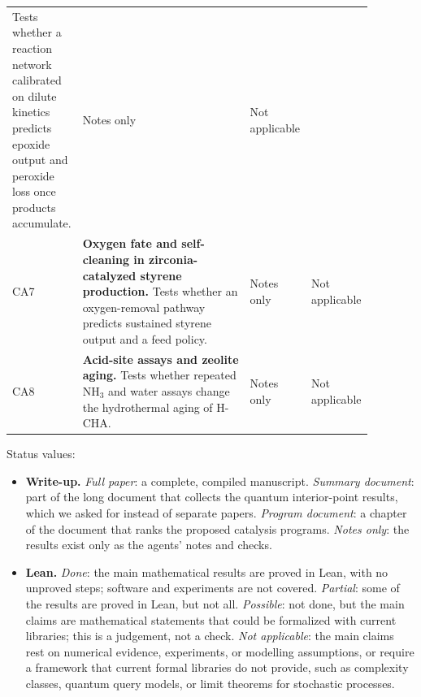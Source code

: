 \begin{small}
\begin{longtable}{@{}l>{\raggedright\arraybackslash}p{0.60\linewidth}%
  >{\raggedright\arraybackslash}p{0.15\linewidth}%
  >{\raggedright\arraybackslash}p{0.13\linewidth}@{}}
  Tests whether a reaction network calibrated on dilute kinetics predicts
  epoxide output and peroxide loss once products accumulate.
  & Notes only & Not applicable \\
CA7 & \textbf{Oxygen fate and self-cleaning in zirconia-catalyzed styrene
  production.}
  Tests whether an oxygen-removal pathway predicts sustained styrene output and
  a feed policy.
  & Notes only & Not applicable \\
CA8 & \textbf{Acid-site assays and zeolite aging.}
  Tests whether repeated NH$_3$ and water assays change the hydrothermal aging of
  H-CHA.
  & Notes only & Not applicable \\
\end{longtable}
\end{small}

\noindent Status values:
\begin{itemize}[leftmargin=1.2em]
  \item \textbf{Write-up.}
  \emph{Full paper}: a complete, compiled manuscript.
  \emph{Summary document}: part of the long document that collects the quantum interior-point results, which we asked for instead of separate papers.
  \emph{Program document}: a chapter of the document that ranks the proposed catalysis programs.
  \emph{Notes only}: the results exist only as the agents' notes and checks.
  \item \textbf{Lean.}
  \emph{Done}: the main mathematical results are proved in Lean, with no unproved steps; software and experiments are not covered.
  \emph{Partial}: some of the results are proved in Lean, but not all.
  \emph{Possible}: not done, but the main claims are mathematical statements that could be formalized with current libraries; this is a judgement, not a check.
  \emph{Not applicable}: the main claims rest on numerical evidence, experiments, or modelling assumptions, or require a framework that current formal libraries do not provide, such as complexity classes, quantum query models, or limit theorems for stochastic processes.
\end{itemize}
